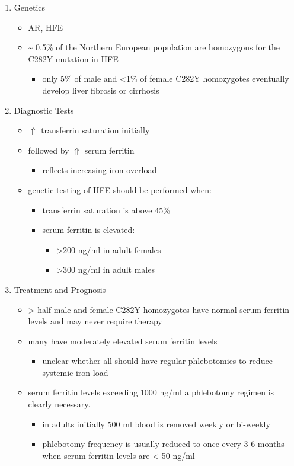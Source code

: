 \documentclass{scrartcl}
\begin{document}
\begin{enumerate}
\item Genetics
\label{sec:org7fc65d6}
\begin{itemize}
\item AR, HFE
\item \textasciitilde{} 0.5\% of the Northern European population are homozygous for the
C282Y mutation in HFE
\begin{itemize}
\item only 5\% of male and <1\% of female C282Y homozygotes eventually
develop liver fibrosis or cirrhosis
\end{itemize}
\end{itemize}

\item Diagnostic Tests
\label{sec:orgbd11350}
\begin{itemize}
\item \(\Uparrow\) transferrin saturation initially
\item followed by \(\Uparrow\) serum ferritin
\begin{itemize}
\item reflects increasing iron overload
\end{itemize}
\item genetic testing of HFE should be performed when:
\begin{itemize}
\item transferrin saturation is above 45\%
\item serum ferritin is elevated:
\begin{itemize}
\item >200 ng/ml in adult females
\item >300 ng/ml in adult males
\end{itemize}
\end{itemize}
\end{itemize}

\item Treatment and Prognosis
\label{sec:org09d86d9}
\begin{itemize}
\item \textgreater{} half male and female C282Y homozygotes have normal serum
ferritin levels and may never require therapy
\item many have moderately elevated serum ferritin levels
\begin{itemize}
\item unclear whether all should have regular
phlebotomies to reduce systemic iron load
\end{itemize}
\item serum ferritin levels exceeding 1000 ng/ml a phlebotomy regimen is clearly
necessary.
\begin{itemize}
\item in adults initially 500 ml blood is removed weekly or bi-weekly
\item phlebotomy frequency is usually reduced to once every 3-6 months
when serum ferritin levels are \textless{} 50 ng/ml
\end{itemize}
\end{itemize}
\end{enumerate}
\end{document}
